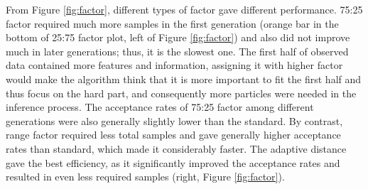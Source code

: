 From Figure \ref{fig:factor}, different types of factor gave different performance. 75:25 factor required much more samples in the first generation (orange bar in the bottom of 25:75 factor plot, left of Figure \ref{fig:factor}) and also did not improve much in later generations; thus, it is the slowest one. The first half of observed data contained more features and information, assigning it with higher factor would make the algorithm think that it is more important to fit the first half and thus focus on the hard part, and consequently more particles were needed in the inference process. The acceptance rates of 75:25 factor among different generations were also generally slightly lower than the standard. By contrast, range factor required less total samples and gave generally higher acceptance rates than standard, which made it considerably faster. The adaptive distance gave the best efficiency, as it significantly improved the acceptance rates and resulted in even less required samples (right, Figure \ref{fig:factor}).

